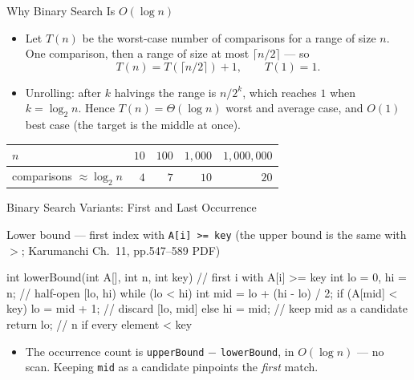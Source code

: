 \documentclass[aspectratio=169]{beamer}
\begin{document}
\begin{frame}{Why Binary Search Is $O(\log n)$}
  \begin{itemize}
    \item Let $T(n)$ be the worst-case number of comparisons for a range of
      size $n$. One comparison, then a range of size at most $\lceil n/2
      \rceil$ --- so
      \[ T(n) = T(\lceil n/2 \rceil) + 1, \qquad T(1) = 1. \]
    \item Unrolling: after $k$ halvings the range is $n/2^{k}$, which reaches
      $1$ when $k = \log_2 n$. Hence $T(n) = \Theta(\log n)$ worst and average
      case, and $O(1)$ best case (the target is the middle at once).
  \end{itemize}
  \begin{center}
  {\footnotesize
  \begin{tabular}{lrrrr}
    \toprule
    $n$ & $10$ & $100$ & $1{,}000$ & $1{,}000{,}000$ \\
    \midrule
    comparisons $\approx \log_2 n$ & $4$ & $7$ & $10$ & $20$ \\
    \bottomrule
  \end{tabular}}
  \end{center}
\end{frame}

\begin{frame}[fragile]{Binary Search Variants: First and Last Occurrence}
  \footnotesize
  \begin{block}{Lower bound --- first index with \texttt{A[i] >= key}
    (the upper bound is the same with $>$; Karumanchi Ch.~11, pp.547--589 PDF)}
\begin{semiverbatim}
int lowerBound(int A[], int n, int key) {   // first i with A[i] >= key
  int lo = 0, hi = n;                        // half-open [lo, hi)
  while (lo < hi) {
    int mid = lo + (hi - lo) / 2;
    if (A[mid] < key) lo = mid + 1;          // discard [lo, mid]
    else hi = mid;                           // keep mid as a candidate
  }
  return lo;                                 // n if every element < key
}
\end{semiverbatim}
  \end{block}
  \begin{itemize}
    \item The occurrence count is \texttt{upperBound} $-$ \texttt{lowerBound},
      in $O(\log n)$ --- no scan. Keeping \texttt{mid} as a candidate
      pinpoints the \emph{first} match.
  \end{itemize}
\end{frame}
\end{document}
